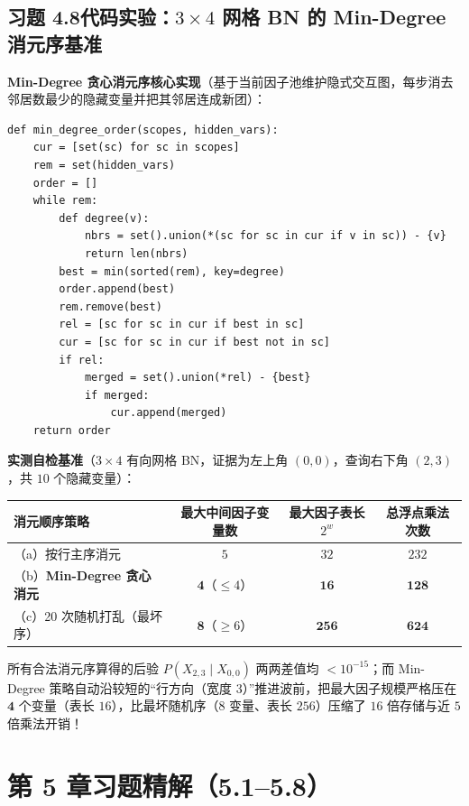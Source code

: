 \subsection*{习题 4.8\quad 代码实验：$3\times 4$ 网格 BN 的 Min-Degree 消元序基准}
\textbf{Min-Degree 贪心消元序核心实现}（基于当前因子池维护隐式交互图，每步消去邻居数最少的隐藏变量并把其邻居连成新团）：
\begin{lstlisting}
def min_degree_order(scopes, hidden_vars):
    cur = [set(sc) for sc in scopes]
    rem = set(hidden_vars)
    order = []
    while rem:
        def degree(v):
            nbrs = set().union(*(sc for sc in cur if v in sc)) - {v}
            return len(nbrs)
        best = min(sorted(rem), key=degree)
        order.append(best)
        rem.remove(best)
        rel = [sc for sc in cur if best in sc]
        cur = [sc for sc in cur if best not in sc]
        if rel:
            merged = set().union(*rel) - {best}
            if merged:
                cur.append(merged)
    return order
\end{lstlisting}
\textbf{实测自检基准}（$3\times 4$ 有向网格 BN，证据为左上角 $(0,0)$，查询右下角 $(2,3)$，共 $10$ 个隐藏变量）：
\begin{center}
\small
\begin{tabular}{@{}lccc@{}}
\toprule
\textbf{消元顺序策略} & \textbf{最大中间因子变量数} & \textbf{最大因子表长 $2^w$} & \textbf{总浮点乘法次数} \\
\midrule
（a）按行主序消元 & $5$ & $32$ & $232$ \\
（b）\textbf{Min-Degree 贪心消元} & $\mathbf{4}$（$\le 4$） & $\mathbf{16}$ & $\mathbf{128}$ \\
（c）20 次随机打乱（最坏序） & $\mathbf{8}$（$\ge 6$） & $\mathbf{256}$ & $\mathbf{624}$ \\
\bottomrule
\end{tabular}
\end{center}
所有合法消元序算得的后验 $P(X_{2,3}\mid X_{0,0})$ 两两差值均 $< 10^{-15}$；而 Min-Degree 策略自动沿较短的“行方向（宽度 $3$）”推进波前，把最大因子规模严格压在 $\mathbf{4}$ 个变量（表长 $16$），比最坏随机序（$8$ 变量、表长 $256$）压缩了 $16$ 倍存储与近 $5$ 倍乘法开销！

\section{第 5 章习题精解（5.1--5.8）}

